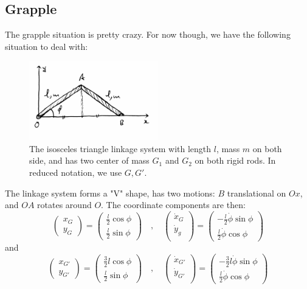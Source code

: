 \subsection{Grapple}
The grapple situation is pretty crazy. For now though, we have the following situation to deal with: 
\begin{figure}
    \centering
    \includegraphics[width=0.5\textwidth]{img/c5_wiggle.jpg}
    \caption{The isosceles triangle linkage system with length $l$, mass $m$ on both side, and has two center of mass $G_{1}$ and $G_{2}$ on both rigid rods. In reduced notation, we use $G,G'$.}
\end{figure}
The linkage system forms a "V" shape, has two motions: $B$ translational on $Ox$, and $OA$ rotates around $O$. The coordinate components are then:
\begin{equation}
    \begin{pmatrix}
        x_{G} \\
        y_{G}
    \end{pmatrix}
    = 
    \begin{pmatrix}
        \frac{l}{2}\cos{\phi}\\
        \frac{l}{2}\sin{\phi}
    \end{pmatrix}
    \quad , \quad 
    \begin{pmatrix}
        \dot{x}_{G}\\
        \dot{y}_{g}\\
    \end{pmatrix}
    =
    \begin{pmatrix}
        -\frac{l}{2} \dot{\phi} \sin{\phi}\\
        \frac{l}{2} \dot{\phi}\cos{\phi}
    \end{pmatrix}
\end{equation}
and 
\begin{equation}
    \begin{pmatrix}
        x_{G'} \\
        y_{G'}
    \end{pmatrix}
    = 
    \begin{pmatrix}
        \frac{3}{2}l\cos{\phi}\\
        \frac{l}{2}\sin{\phi}
    \end{pmatrix}
    \quad , \quad 
    \begin{pmatrix}
        \dot{x}_{G'}\\
        \dot{y}_{G'}\\
    \end{pmatrix}
    =
    \begin{pmatrix}
        -\frac{3}{2}l \dot{\phi} \sin{\phi}\\
        \frac{l}{2} \dot{\phi}\cos{\phi}
    \end{pmatrix}
\end{equation}

